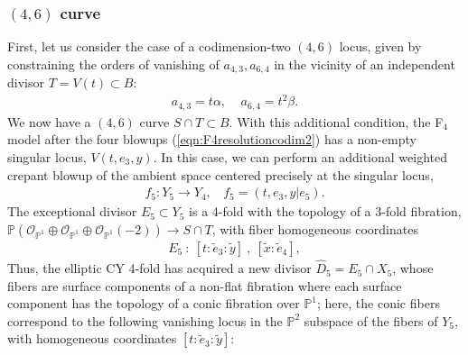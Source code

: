 \documentclass[11pt,oneside,english]{article}
\numberwithin{equation}{section}
\theoremstyle{definition}
\begin{document}
\subsubsection{$(4,6)$ curve}
First, let us consider the case of a codimension-two $(4,6)$ locus, given by constraining the orders of vanishing of $a_{4,3}, a_{6,4}$ in the vicinity of an independent divisor $T= V(t) \subset B$:
	\begin{align}
		a_{4,3} =t \alpha,~~~~~ a_{6,4} = t^2\beta.
	\end{align}
We now have a $(4,6)$ curve $S \cap T \subset B$. With this additional condition, the F$_4$ model after the four blowups (\ref{eqn:F4resolutioncodim2}) has a non-empty singular locus, $V(t,e_3, y)$. In this case, we can perform an additional weighted crepant blowup of the ambient space centered precisely at the singular locus,
	\begin{align}
	\label{eqn:fifthblowup}
		f_5 : Y_5 \rightarrow Y_4,~~~~f_5 = (t,e_3,y|e_5). 
	\end{align}
The exceptional divisor $E_5 \subset Y_5$ is a 4-fold with the topology of a 3-fold fibration, $ \mathbb P( \mathcal O_{\mathbb P^1} \oplus \mathcal O_{\mathbb P^1} \oplus \mathcal O_{\mathbb P^1} (-2) ) \rightarrow  S \cap T$, with fiber homogeneous coordinates
	\begin{align}
	\label{eqn:E5coord}
		{E}_5~:~ [ t: \tilde e_3: \tilde y]~,~ [\tilde x : \tilde e_4],%
	\end{align}
Thus, the elliptic CY 4-fold has acquired a new divisor $\hat D_5 = {E}_5 \cap {X}_5$, 
whose fibers are surface components of a non-flat fibration where each surface component has the topology of a conic fibration over $\mathbb P^1$; here, the conic fibers correspond to the following vanishing locus in the $\mathbb P^2$ subspace of the fibers of $Y_5$, with homogeneous coordinates $[t:\tilde e_3: \tilde y]$:
\end{document}
